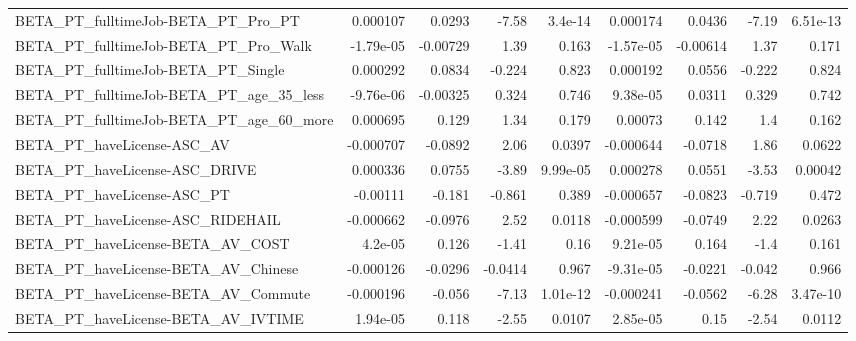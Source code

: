 \begin{tabular}{lrrrrrrrr}
BETA\_PT\_fulltimeJob-BETA\_PT\_Pro\_PT                 &    0.000107 &       0.0293 &     -7.58 &  3.4e-14 &   0.000174 &      0.0436 &        -7.19 &      6.51e-13 \\
BETA\_PT\_fulltimeJob-BETA\_PT\_Pro\_Walk               &   -1.79e-05 &     -0.00729 &      1.39 &    0.163 &  -1.57e-05 &    -0.00614 &         1.37 &         0.171 \\
BETA\_PT\_fulltimeJob-BETA\_PT\_Single                 &    0.000292 &       0.0834 &    -0.224 &    0.823 &   0.000192 &      0.0556 &       -0.222 &         0.824 \\
BETA\_PT\_fulltimeJob-BETA\_PT\_age\_35\_less            &   -9.76e-06 &     -0.00325 &     0.324 &    0.746 &   9.38e-05 &      0.0311 &        0.329 &         0.742 \\
BETA\_PT\_fulltimeJob-BETA\_PT\_age\_60\_more            &    0.000695 &        0.129 &      1.34 &    0.179 &    0.00073 &       0.142 &          1.4 &         0.162 \\
BETA\_PT\_haveLicense-ASC\_AV                         &   -0.000707 &      -0.0892 &      2.06 &   0.0397 &  -0.000644 &     -0.0718 &         1.86 &        0.0622 \\
BETA\_PT\_haveLicense-ASC\_DRIVE                      &    0.000336 &       0.0755 &     -3.89 & 9.99e-05 &   0.000278 &      0.0551 &        -3.53 &       0.00042 \\
BETA\_PT\_haveLicense-ASC\_PT                         &    -0.00111 &       -0.181 &    -0.861 &    0.389 &  -0.000657 &     -0.0823 &       -0.719 &         0.472 \\
BETA\_PT\_haveLicense-ASC\_RIDEHAIL                   &   -0.000662 &      -0.0976 &      2.52 &   0.0118 &  -0.000599 &     -0.0749 &         2.22 &        0.0263 \\
BETA\_PT\_haveLicense-BETA\_AV\_COST                   &     4.2e-05 &        0.126 &     -1.41 &     0.16 &   9.21e-05 &       0.164 &         -1.4 &         0.161 \\
BETA\_PT\_haveLicense-BETA\_AV\_Chinese                &   -0.000126 &      -0.0296 &   -0.0414 &    0.967 &  -9.31e-05 &     -0.0221 &       -0.042 &         0.966 \\
BETA\_PT\_haveLicense-BETA\_AV\_Commute                &   -0.000196 &       -0.056 &     -7.13 & 1.01e-12 &  -0.000241 &     -0.0562 &        -6.28 &      3.47e-10 \\
BETA\_PT\_haveLicense-BETA\_AV\_IVTIME                 &    1.94e-05 &        0.118 &     -2.55 &   0.0107 &   2.85e-05 &        0.15 &        -2.54 &        0.0112 \\

\end{tabular}

